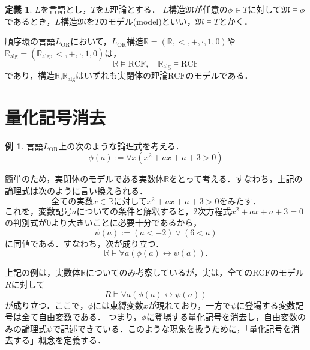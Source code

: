 \documentclass[uplatex, dvipdfmx]{jsarticle}
\newcommand{\R}{\mathbb{R}}
\newcommand{\Ralg}{\mathbb{R}_\mathrm{alg}}
\newcommand{\M}{\mathfrak{M}}
\newcommand{\RCF}{\mathrm{RCF}}
\theoremstyle{definition}
\newtheorem{definition}{定義}[section]
\newtheorem{example}{例}[section]
\begin{document}
\begin{definition}
     $L$を言語とし，$T$を$L$理論とする．
     $L$構造$\M$が任意の$\phi \in T$に対して$\M\models \phi$であるとき，$L$構造$\M$を$T$のモデル(model)といい，$\M \models T$とかく．
\end{definition}

順序環の言語$L_{\mathrm{OR}}$において，$L_\mathrm{OR}$構造$\R=(\R,<,+,\cdot,1,0)$や$\Ralg=(\Ralg,<,+,\cdot,1,0)$は，
\[
     \R \models \RCF, \quad \Ralg \models \RCF
\]
であり，構造$\R$,$\Ralg$はいずれも実閉体の理論$\RCF$のモデルである．

\section{量化記号消去}

\begin{example}
     言語$L_\mathrm{OR}$上の次のような論理式を考える．
     \begin{equation*}
          \phi(a) := \forall x (x^2 + ax + a + 3 > 0)
     \end{equation*}

     簡単のため，実閉体のモデルである実数体$\R$をとって考える．すなわち，上記の論理式は次のように言い換えられる．
     \begin{equation*}
          \text{全ての実数$x \in \R$に対して$x^2 + ax + a + 3 > 0$をみたす．}  
     \end{equation*}
     これを，変数記号$a$についての条件と解釈すると，2次方程式$x^2 + ax + a + 3 = 0$の判別式が0より大きいことに必要十分であるから，
     \begin{equation*}
          \psi(a) := (a < -2) \lor (6 < a)
     \end{equation*}
     に同値である．すなわち，次が成り立つ．
     \begin{equation*}
          \R \models \forall a (\phi(a) \leftrightarrow \psi(a)).
     \end{equation*}
\end{example}

上記の例は，実数体$\R$についてのみ考察しているが，実は，全ての$\RCF$のモデル$R$に対して
\begin{equation*}
     R \models \forall a (\phi(a) \leftrightarrow \psi(a))
\end{equation*}
が成り立つ．ここで，$\phi$には束縛変数$x$が現れており，一方で$\psi$に登場する変数記号は全て自由変数である．
つまり，$\phi$に登場する量化記号を消去し，自由変数のみの論理式$\psi$で記述できている．このような現象を扱うために，「量化記号を消去する」概念を定義する．
\end{document}
